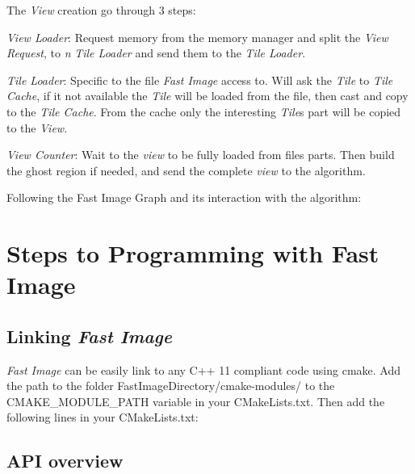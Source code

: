The {\itshape View} creation go through 3 steps\+:
\begin{DoxyEnumerate}
\item {\itshape View Loader}\+: Request memory from the memory manager and split the {\itshape View Request}, to {\itshape n} {\itshape Tile Loader} and send them to the {\itshape Tile Loader}.
\item {\itshape Tile Loader}\+: Specific to the file {\itshape Fast Image} access to. Will ask the {\itshape Tile} to {\itshape Tile Cache}, if it not available the {\itshape Tile} will be loaded from the file, then cast and copy to the {\itshape Tile Cache}. From the cache only the interesting {\itshape Tile}\textquotesingle{}s part will be copied to the {\itshape View}.
\item {\itshape View Counter}\+: Wait to the {\itshape view} to be fully loaded from file\textquotesingle{}s parts. Then build the ghost region if needed, and send the complete {\itshape view} to the algorithm.
\end{DoxyEnumerate}

Following the Fast Image Graph and it\textquotesingle{}s interaction with the algorithm\+:

 \section*{Steps to Programming with Fast Image}

\subsection*{Linking {\itshape Fast Image}}

{\itshape Fast Image} can be easily link to any C++ 11 compliant code using cmake. Add the path to the folder Fast\+Image\+Directory/cmake-\/modules/ to the C\+M\+A\+K\+E\+\_\+\+M\+O\+D\+U\+L\+E\+\_\+\+P\+A\+TH variable in your C\+Make\+Lists.\+txt. Then add the following lines in your C\+Make\+Lists.\+txt\+: 


\subsection*{A\+PI overview}

